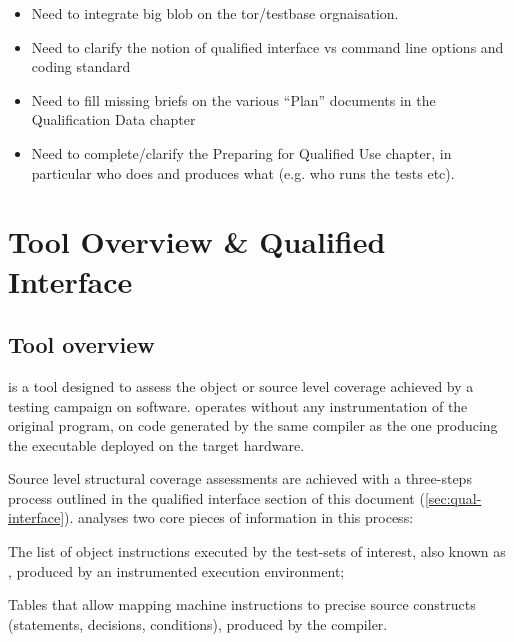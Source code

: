 \documentclass {report}
\begin{document}
\begin{itemize}
\item%
  Need to integrate big blob on the tor/testbase orgnaisation.
%
\item%
  Need to clarify the notion of qualified interface vs command line
  options and coding standard
%
\item%
  Need to fill missing briefs on the various ``Plan'' documents in
  the Qualification Data chapter
%
\item%
  Need to complete/clarify the Preparing for Qualified Use chapter,
  in particular who does and produces what (e.g. who runs the tests etc).
\end{itemize}



\chapter{Tool Overview \& Qualified Interface}

\section{Tool overview}

\xcov{} is a tool designed to assess the object or source level coverage
achieved by a testing campaign on software.
%
\xcov{} operates without any instrumentation of the original program, on
code generated by the same compiler as the one producing the executable
deployed on the target hardware.

Source level structural coverage assessments are achieved with a three-steps
process outlined in the qualified interface section of this document
(\ref{sec:qual-interface}).
%
\xcov{} analyses two core pieces of information in this process:

\begin{Itemize}
%
\item The list of object instructions executed by the test-sets of interest,
  also known as , produced by an instrumented execution
  environment;
%
\item Tables that allow mapping machine instructions to precise source
  constructs (statements, decisions, conditions), produced by the compiler.
\end{Itemize}
\end{document}
